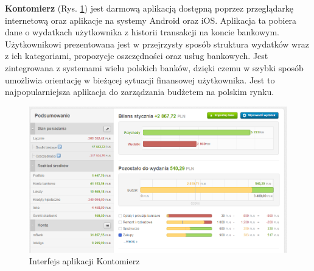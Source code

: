 \textbf{Kontomierz} (Rys. \ref{kontomierz_interfejs}) jest darmową aplikacją dostępną poprzez przeglądarkę internetową oraz aplikacje na systemy Android oraz iOS. Aplikacja ta pobiera dane o wydatkach użytkownika z historii transakcji na koncie bankowym. Użytkownikowi prezentowana jest w przejrzysty sposób struktura wydatków wraz z ich kategoriami, propozycje oszczędności oraz usług bankowych. Jest zintegrowana z systemami wielu polskich banków, dzięki czemu w szybki sposób umożliwia orientację w bieżącej sytuacji finansowej użytkownika. Jest to najpopularniejsza aplikacja do zarządzania budżetem na polskim rynku.
\begin{figure}[!ht]
	\begin{center}
		\includegraphics[width=6in]{img/aplikacje/kontomierz_interfejs.png}
		\caption{Interfejs aplikacji Kontomierz}
		\label{kontomierz_interfejs}
	\end{center}
\end{figure}


